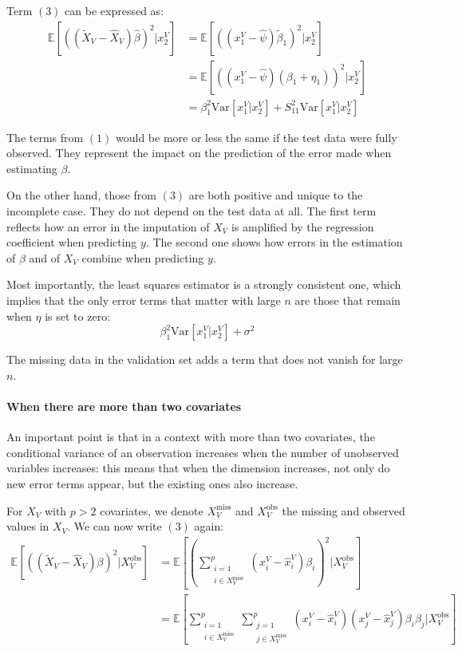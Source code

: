 \documentclass[12pt, a4paper]{memoir}
\begin{document}
Term $(3)$ can be expressed as:
\begin{align*}
\mathbb{E}[((\tilde{X}_V - \hat{X}_V) \hat{\beta})^2 \vert x^V_2]&= \mathbb{E}[((x^V_1 - \hat{\psi})\tilde{\beta}_1)^2 \vert x^V_2] \\
									 &= \mathbb{E}[((x^V_1 - \hat{\psi})(\beta_1 + \eta_1))^2 \vert x^V_2] \\
									&= \beta_1^2 \text{Var}[x^V_1 \vert x^V_2] + S_{11}^2 \text{Var}[x^V_1 \vert x^V_2] 
\end{align*}

The terms from $(1)$ would be more or less the same if the test data were fully observed. They represent the impact on the prediction of the error made when estimating $\beta$.

 On the other hand, those from $(3)$ are both positive and unique to the incomplete case. They do not depend on the test data at all. The first term reflects how an error in the imputation of $X_V$ is amplified by the regression coefficient when predicting $y$. The second one shows how errors in the estimation of $\beta$ and of $X_V$ combine when predicting $y$.
 
 Most importantly, the least squares estimator is a strongly consistent one\cite{consistency_linreg}, which implies that the only error terms that matter with large $n$ are those that remain when $\eta$ is set to zero:
 $$ \beta_1^2 \text{Var}[x^V_1 \vert x^V_2] + \sigma^2 $$
 
 The missing data in the validation set adds a term that does not vanish for large $n$.
 
 \paragraph*{When there are more than two covariates}
 An important point is that in a context with more than two covariates, the conditional variance of an observation increases when the number of unobserved variables increases: this means that when the dimension increases, not only do new error terms appear, but the existing ones also increase.
 
 For $X_V$ with $p>2$ covariates, we denote $X_V^{\text{miss}}$ and $X_V^{\text{obs}}$ the missing and observed values in $X_V$. We can now write $(3)$ again:
 \begin{align*}
 \mathbb{E}[((\tilde{X}_V - \hat{X}_V)\beta)^2 \vert X_V^{\text{obs}}] &= 
 		\mathbb{E}[ (\sum \limits_{\substack{i=1 \\i \in X_V^{\text{miss}}}}^{p} (x_i^V - \hat{x}_i^V)\beta_i)^2 \vert X_V^{\text{obs}}] \\
 		&= \mathbb{E}[\sum \limits_{\substack{i=1 \\i \in X_V^{\text{miss}}}}^{p} \sum \limits_{\substack{j=1 \\j \in X_V^{\text{miss}}}}^{p}
 			(x^V_i - \hat{x}^V_i)(x^V_j - \hat{x}^V_j)\beta_i \beta_j \vert X_V^{\text{obs}}]
 \end{align*}
 
\end{document}
